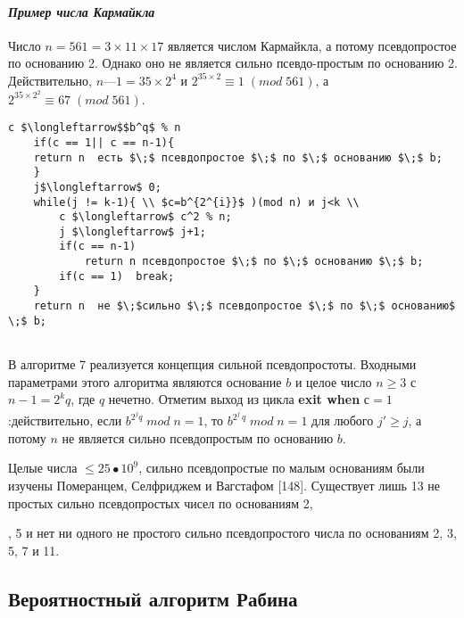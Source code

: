   	\paragraph{{\it Пример числа Кармайкла}}
  	\noindent
  	
  	Число $n = 561 = 3 \times 11 \times 17$ является числом Кармайкла, а потому 	псевдопростое по основанию 2. Однако оно не является сильно псевдо-простым по основанию 2. Действительно, $n — 1 = 35 \times 2^4$
  	и $2^{35\times 2} \equiv1\;(mod\;561)$, а $2^{35\times 2^2} \equiv 67\;(mod\;561)$.
  	
  	\begin{lstlisting}[mathescape=true, caption=Сильная псевдопростота по основанию $b$]
  	c $\longleftarrow$$b^q$ % n
  	if(c == 1|| c == n-1){
  	return n  есть $\;$ псевдопростое $\;$ по $\;$ основанию $\;$ b;
  	} 
  	j$\longleftarrow$ 0;
  	while(j != k-1){ \\ $c=b^{2^{i}}$ )(mod n) и j<k \\
  		c $\longleftarrow$ c^2 % n;
  		j $\longleftarrow$ j+1;
  		if(c == n-1)
  			return n псевдопростое $\;$ по $\;$ основанию $\;$ b;
  		if(c == 1)	break;
  	}	
  	return n  не $\;$сильно $\;$ псевдопростое $\;$ по $\;$ основанию$ \;$ b;
  	 
  	\end{lstlisting}
  	В алгоритме 7 реализуется концепция сильной псевдопростоты.	Входными параметрами этого алгоритма являются основание $b$ и це­лое число $n \geqslant 3$ с $n - 1 = 2^kq$, где $q$ нечетно. Отметим выход из цикла	{\bf exit when} $с = 1$:действительно, если $b^{2^{j}q} \;mod\;n = 1$, то $b^{2^{j^{'}}q}\;mod\;n = 1$	для любого $j' \geqslant j$, а потому $n$ не является сильно псевдопростым по основанию $b$. 
  	
  	Целые числа  $\leqslant 25 • 10^9$, сильно псевдопростые по малым основаниям 	были изучены Померанцем, Селфриджем и Вагстафом [148]. Существует лишь 13 не простых сильно псевдопростых чисел по основаниям 2,
  	
  	\pagebreak
  	
  	
  	, 5 и нет ни одного не простого сильно псевдопростого числа по основаниям 2, 3, 5, 7 и 11.
  	
  	\subsection{Вероятностный алгоритм Рабина}
  	
